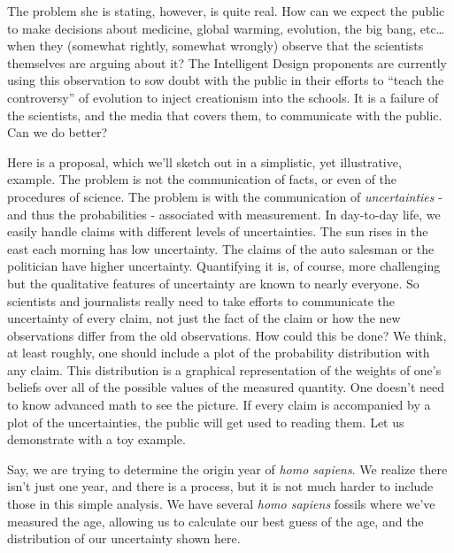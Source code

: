 The problem she is stating, however, is quite real. How can we expect
the public to make decisions about medicine, global warming, evolution,
the big bang, etc\ldots{} when they (somewhat rightly, somewhat wrongly)
observe that the scientists themselves are arguing about it? The
Intelligent Design proponents are currently using this observation to sow
doubt with the public in their efforts to ``teach the controversy'' of
evolution to inject creationism into the schools. It is a failure of the
scientists, and the media that covers them, to communicate with the
public. Can we do better?

Here is a proposal, which we'll sketch out in a simplistic, yet illustrative, example. The problem
is not the communication of facts, or even of the procedures of science.
The problem is with the communication of \emph{uncertainties} - and thus the probabilities - associated with measurement. In day-to-day life, we easily handle claims with different levels of
uncertainties. The sun rises in the east each morning has low
uncertainty. The claims of the auto salesman or the politician have
higher uncertainty. Quantifying it is, of course, more challenging but
the qualitative features of uncertainty are known to nearly everyone. So
scientists and journalists really need to take efforts to communicate
the uncertainty of every claim, not just the fact of the claim or how
the new observations differ from the old observations. How could this be
done?  We think, at least roughly, one should include a plot of the
probability distribution with any claim. This distribution is a graphical representation of the weights of one's beliefs over all of the possible values of the measured quantity.  One doesn't need to know
advanced math to see the picture. If every claim is accompanied by a
plot of the uncertainties, the public will get used to reading them. Let
us demonstrate with a toy example.

Say, we are trying to determine the origin year of {\em homo sapiens}. We realize there isn't just one year, and there is a process, but it is not much harder to include those in this simple analysis.  We have several {\em homo sapiens} fossils where we've measured the age, allowing us to
calculate our best guess of the age, and the distribution of our
uncertainty shown here.

